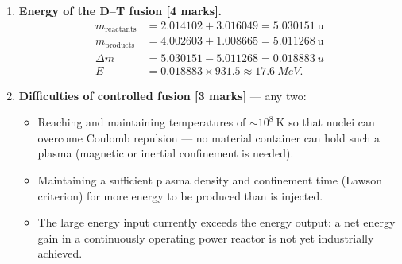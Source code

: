 \documentclass[11pt]{article}
\begin{document}
\begin{corrige}
\begin{enumerate}
\begin{enumerate}
        \item \emph{Fusion:} very light nuclei ($^{2}\mathrm{H}$, $^{3}\mathrm{H}$) lie very low on the curve ($B/A \approx 1$--$3\ \mathrm{MeV}$). Fusing them into $^{4}\mathrm{He}$ ($B/A \approx 7.1\ \mathrm{MeV}$) moves the nucleons \emph{up} the curve to a much more bound state, releasing the difference as energy. [2 marks]
    \end{enumerate}
    In both cases, energy is released because the products are \emph{more tightly bound} (greater $B/A$) than the reactants.
    \item \textbf{Energy of the D--T fusion [4 marks].}
    \begin{align*}
    m_{\text{reactants}} &= 2.014102 + 3.016049 = 5.030151\ \mathrm{u}\\
    m_{\text{products}} &= 4.002603 + 1.008665 = 5.011268\ \mathrm{u}\\
    \Delta m &= 5.030151 - 5.011268 = \SI{0.018883}{u}\\
    E &= 0.018883 \times 931.5 \approx \SI{17.6}{MeV}.
    \end{align*}
    \item \textbf{Difficulties of controlled fusion [3 marks]} — any two:
    \begin{itemize}
        \item Reaching and maintaining temperatures of $\sim 10^{8}\ \mathrm{K}$ so that nuclei can overcome Coulomb repulsion — no material container can hold such a plasma (magnetic or inertial confinement is needed).
        \item Maintaining a sufficient plasma density and confinement time (Lawson criterion) for more energy to be produced than is injected.
        \item The large energy input currently exceeds the energy output: a net energy gain in a continuously operating power reactor is not yet industrially achieved.
    \end{itemize}
\end{enumerate}
\end{corrige}
\end{document}

